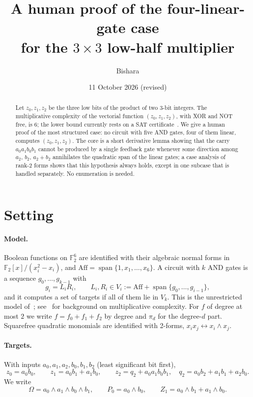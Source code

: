 \documentclass[11pt,a4paper]{article}
\title{\bfseries A human proof of the four-linear-gate case\\ for the $3\times 3$ low-half multiplier}
\author{Bishara}
\date{11 October 2026 (revised)}
\theoremstyle{plain}
\theoremstyle{definition}
\theoremstyle{remark}
\newcommand{\F}{\mathbb{F}_2}
\newcommand{\Aff}{\mathrm{Aff}}
\newcommand{\Span}{\operatorname{span}}
\begin{document}
\maketitle

\begin{abstract}
\noindent
Let $z_0,z_1,z_2$ be the three low bits of the product of two 3-bit integers. The multiplicative complexity of the vectorial function $(z_0,z_1,z_2)$, with XOR and NOT free, is 6; the lower bound currently rests on a SAT certificate~\cite{cert}. We give a human proof of the most structured case: no circuit with five AND gates, four of them linear, computes $(z_0,z_1,z_2)$. The core is a short derivative lemma showing that the carry $a_0a_1b_0b_1$ cannot be produced by a single feedback gate whenever some direction among $a_2$, $b_2$, $a_2+b_2$ annihilates the quadratic span of the linear gates; a case analysis of rank-2 forms shows that this hypothesis always holds, except in one subcase that is handled separately. No enumeration is needed.
\end{abstract}

\section{Setting}

\paragraph{Model.}
Boolean functions on $\F^6$ are identified with their algebraic normal forms in $\F[x]/(x_i^2-x_i)$, and $\Aff=\Span\{1,x_1,\dots,x_6\}$. A circuit with $k$ AND gates is a sequence $g_0,\dots,g_{k-1}$ with
\[
  g_i=L_iR_i,\qquad L_i,R_i\in V_i:=\Aff+\Span\{g_0,\dots,g_{i-1}\},
\]
and it computes a set of targets if all of them lie in $V_k$. This is the unrestricted model of~\cite{morse}; see~\cite{bpp,bf,schnorr} for background on multiplicative complexity. For $f$ of degree at most $2$ we write $f=f_0+f_1+f_2$ by degree and $\pi_d$ for the degree-$d$ part. Squarefree quadratic monomials are identified with 2-forms, $x_ix_j\leftrightarrow x_i\wedge x_j$.

\paragraph{Targets.}
With inputs $a_0,a_1,a_2,b_0,b_1,b_2$ (least significant bit first),
\[
  z_0=a_0b_0,\qquad z_1=a_0b_1+a_1b_0,\qquad z_2=q_2+a_0a_1b_0b_1,\quad q_2=a_0b_2+a_1b_1+a_2b_0 .
\]
We write
\[
  \Omega=a_0\wedge a_1\wedge b_0\wedge b_1,\qquad P_0=a_0\wedge b_0,\qquad Z_1=a_0\wedge b_1+a_1\wedge b_0 .
\]
\end{document}
